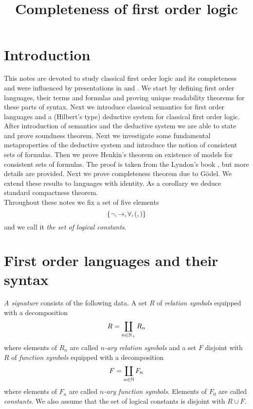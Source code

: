 



\title{Completeness of first order logic}
\date{}
\maketitle

\section{Introduction}
\noindent
This notes are devoted to study classical first order logic and its completeness and were influenced by presentations in \cite{enderton2001mathematical} and \cite{lyndon1966notes}. We start by defining first order languages, their terms and formulas and proving unique readability theorems for these parts of syntax. Next we introduce classical semantics for first order languages and a (Hilbert’s type) deductive system for classical first order logic. After introduction of semantics and the deductive system we are able to state and prove soundness theorem. Next we investigate some fundamental metaproperties of the deductive system and introduce the notion of consistent sets of formulas. Then we prove Henkin’s theorem on existence of models for consistent sets of formulas. The proof is taken from the Lyndon’s book \cite{lyndon1966notes}, but more details are provided. Next we prove completeness theorem due to Gödel. We extend these results to languages with identity. As a corollary we deduce standard compactness theorem.\\
Throughout these notes we fix a set of five elements
$$\{\neg, \rightarrow, \forall, (, )\}$$
and we call it \textit{the set of logical constants}.

\section{First order languages and their syntax}

\begin{definition}
\textit{A signature} consists of the following data. A set $R$ of \textit{relation symbols} equipped with a decomposition
$$R = \coprod_{n\in {\mathbb N}_+}R_n$$
where elements of $R_n$ are called \textit{$n$-ary relation symbols} and a set $F$ disjoint with $R$ of \textit{function symbols} equipped with a decomposition
$$F = \coprod_{n\in {\mathbb N}}F_n$$
where elements of $F_n$ are called \textit{$n$-ary function symbols}. Elements of $F_0$ are called \textit{constants}. We also assume that the set of logical constants is disjoint with $R\cup F$.
\end{definition}

